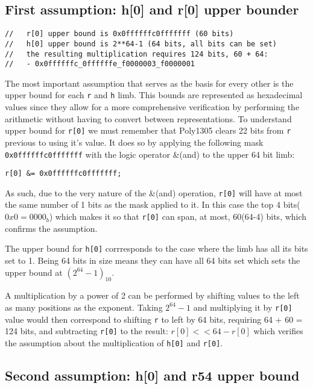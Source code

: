 \documentclass{article}
\begin{document}
\subsection{First assumption: h[0] and r[0] upper bounder}
\begin{Verbatim}[fontsize=\footnotesize]
//   r[0] upper bound is 0x0ffffffc0fffffff (60 bits)
//   h[0] upper bound is 2**64-1 (64 bits, all bits can be set)
//   the resulting multiplication requires 124 bits, 60 + 64:
//   - 0x0ffffffc_0ffffffe_f0000003_f0000001
\end{Verbatim}
The most important assumption that serves as the basis for every other is the upper bound for each \texttt{r} and \texttt{h} limb. 
This bounds are represented as hexadecimal values since they allow for a more comprehensive verification by performing the arithmetic without
having to convert between representations. 
To understand upper bound for \texttt{r[0]} we must remember that Poly1305 clears 22 bits from \texttt{r} previous to using it's value. It does so by applying 
the following mask \texttt{0x0ffffffc0fffffff} with the logic operator \&(and) to the upper 64 bit limb: 
\begin{Verbatim}[fontsize=\footnotesize]
r[0] &= 0x0ffffffc0fffffff;
\end{Verbatim}
As such, due to the very nature of the \&(and) operation, \texttt{r[0]} will have at most the same number of 1 bits as the mask applied to it. In this case 
the top 4 bits($0x0=0000_b$) which makes it so that \texttt{r[0]} can span, at most, 60(64-4) bits, which confirms the assumption.

The upper bound for \texttt{h[0]} corrresponds to the case where the limb has all its bits set to 1. Being 64 bits in size means they can have all 64 bits 
set which sets the upper bound at $(2^{64}-1)_{10}$. 

A multiplication by a power of 2 can be performed by shifting values to the left as many positions as the exponent. Taking $2^{64}-1$ and multiplying it by
\texttt{r[0]} value would then correspond to shifting \texttt{r} to left by 64 bits, requiring 64 + 60 = 124 bits, and subtracting \texttt{r[0]} to the result:
$r[0]<<64 - r[0]$ which verifies the assumption about the multiplication of \texttt{h[0]} and \texttt{r[0]}.

\subsection{Second assumption: h[0] and r54 upper bound}
\end{document}
